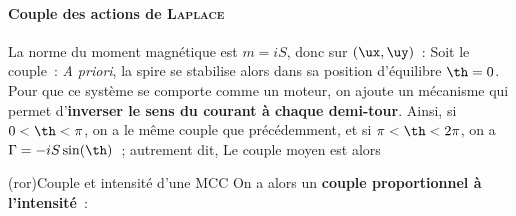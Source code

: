\documentclass[../../main/main.tex]{subfiles}
\begin{document}
\paragraph*{Couple des actions de \textsc{Laplace}}
La norme du moment magnétique est $m = iS$, donc sur $(\ux,\uy)$~:
\psw{%
	\[
		\vv{m} = iS \cos(\th)\uy + iS \sin(\th)\ux
	\]
	\vspace{-10pt}
}%
Soit le couple~:
\psw{%
	\[
		\Gf = \vv{m} \wedge \Bf = iSB\sin(\th) \ud
		\Ra
		\Gamma = iSB\sin(\th)
	\]
}%
\textit{A priori}, la spire se stabilise alors dans sa position d'équilibre $\th
	= 0$. Pour que ce système se comporte comme un moteur, on ajoute un mécanisme
qui permet d'\textbf{inverser le sens du courant à chaque demi-tour}. Ainsi, si
$0 < \th < \pi$, on a le même couple que précédemment, et si $\pi < \th < 2\pi$,
on a $\Gamma = -iS\sin(\th)$~; autrement dit,
\psw{%
	\[
		\boxed{\Gamma = iSB \abs{\sin(\th)}}
	\]
	\vspace{-10pt}
}%
Le couple moyen est alors
%
\begin{tcb*}(ror){Couple et intensité d'une MCC}
	On a alors un \textbf{couple proportionnel à l'intensité}~:
	\psw{%
		\[
			\moy{\Gamma} = KI
			\qav
			K = 4BS/\pi
		\]
	}%
\end{tcb*}
\end{document}
